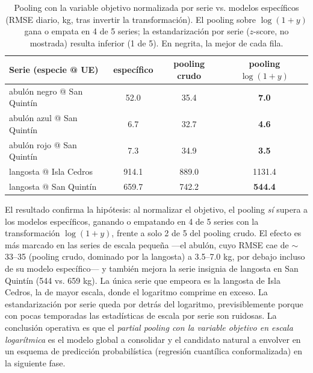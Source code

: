 \begin{table}[htbp]
\centering
\small
\begin{tabular}{lccc}
\toprule
Serie (especie @ UE) & específico & pooling crudo & pooling $\log(1{+}y)$ \\
\midrule
abulón negro @ San Quintín & 52.0 & 35.4 & \textbf{7.0} \\
abulón azul @ San Quintín & 6.7 & 32.7 & \textbf{4.6} \\
abulón rojo @ San Quintín & 7.3 & 34.9 & \textbf{3.5} \\
langosta @ Isla Cedros & 914.1 & 889.0 & 1131.4 \\
langosta @ San Quintín & 659.7 & 742.2 & \textbf{544.4} \\
\bottomrule
\end{tabular}
\caption{Pooling con la variable objetivo normalizada por serie vs. modelos específicos (RMSE diario, kg, tras invertir la transformación). El pooling sobre $\log(1+y)$ gana o empata en 4 de 5 series; la estandarización por serie ($z$-score, no mostrada) resulta inferior (1 de 5). En negrita, la mejor de cada fila.}
\label{tab:extension_ynorm}
\end{table}

El resultado confirma la hipótesis: al normalizar el objetivo, el pooling \emph{sí} supera a los modelos específicos, ganando o empatando en 4 de 5 series con la transformación $\log(1+y)$, frente a solo 2 de 5 del pooling crudo. El efecto es más marcado en las series de escala pequeña —el abulón, cuyo RMSE cae de $\sim$33--35 (pooling crudo, dominado por la langosta) a 3.5--7.0 kg, por debajo incluso de su modelo específico— y también mejora la serie insignia de langosta en San Quintín (544 vs. 659 kg). La única serie que empeora es la langosta de Isla Cedros, la de mayor escala, donde el logaritmo comprime en exceso. La estandarización por serie queda por detrás del logaritmo, previsiblemente porque con pocas temporadas las estadísticas de escala por serie son ruidosas. La conclusión operativa es que el \emph{partial pooling con la variable objetivo en escala logarítmica} es el modelo global a consolidar y el candidato natural a envolver en un esquema de predicción probabilística (regresión cuantílica conformalizada) en la siguiente fase.

